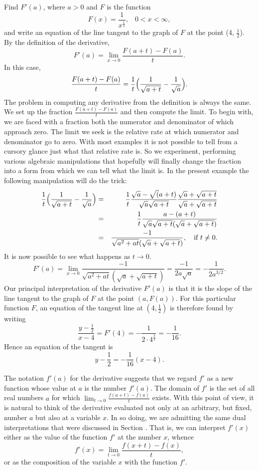 \begin{example}{\label{exam 1.6.3}}
Find $F'(a)$, where $a > 0$ and $F$ is the function
$$
F(x) = \frac{1}{x^{\frac{1}{2}}}, \;\;\;   0 < x < \infty ,
$$
and write an equation of the line
tangent to the graph of $F$ at the point (4, $\frac{1}{2}$).
By the definition of the derivative,
$$
F'(a) = \lim_{x \rightarrow 0} { \frac{F(a + t) - F(a)}{t} } .
$$
In this case,
$$
\frac{F(a + t) - F(a)}{t} = \frac{1}{t} \Bigl( \frac{1}{\sqrt{a + t}} -
\frac{1}{\sqrt a} \Bigr) .
$$
The problem in computing any derivative from the definition
is always the same.
We set up the fraction $\frac{F(a + t) - F(a)}{t}$
and then compute the limit.
To begin with,
we are faced with a fraction
both the numerator and denominator of which approach zero.
The limit we seek is
the relative rate at which numerator and denominator go to zero.
With most examples it is not possible to tell from a cursory glance
just what that relative rate is.
So we experiment, performing various algebraic manipulations
that hopefully will finally change the fraction into a form
from which we can tell what the limit is.
In the present example the following manipulation will do the trick:
\begin{eqnarray*}
\frac{1}{t} \Bigl( \frac{1}{\sqrt{a + t}} - \frac{1}{\sqrt a} \Bigr)
&=& 
{\frac{1}{t}}
{\frac{\sqrt{a} - \sqrt(a + t)}{\sqrt{a} \sqrt{a + t}} }
{\frac{\sqrt{a} + \sqrt{a + t}}{\sqrt{a} + \sqrt{a + t}} }  \\
&=& 
{\frac{1}{t}}
{\frac{a - (a + t)}{\sqrt{a} \sqrt{a + t}
(\sqrt{a} + \sqrt{a + t})}  }\\
&=& 
\frac {-1} {\sqrt{a^2 + at} (\sqrt{a} + \sqrt{a + t} ) },
\quad \mbox{if $t \neq 0$}.
\end{eqnarray*}
It is now possible to see what happens as $t \rightarrow 0$.
$$
F'(a)
=
\lim_{x \rightarrow 0}
{ \frac{-1}{ \sqrt{a^2 + at}
(\sqrt{a} + \sqrt{a + t}) }  }
=
\frac{-1}{2a \sqrt{a}} = - \frac{1}{2a^{3/2}} .
$$
Our principal interpretation of the derivative $F'(a)$
is that it is the slope of the line tangent to the graph of $F$
at the point $(a, F(a))$.
For this particular function $F$,
an equation of the tangent line at
$(4, \frac{1}{2})$
is therefore found by writing
$$
\frac{y - \frac{1}{2}}{x - 4} = F'(4) = -\frac{1}{2 \cdot 4^{\frac{3}{2}}} = -\frac{1}{16} .
$$
Hence an equation of the tangent is
$$
y - \frac{1}{2} = - {\frac{1}{16}} (x - 4).
$$
\end{example}

The notation $f'(a)$ for the derivative
suggests that we regard $f'$
as a new function whose value at $a$
is the number $f'(a)$.
The domain of $f'$ is the set of all real numbers $a$
for which
$\lim_{t \rightarrow 0} \frac{f(a + t) - f(a)}{t}$ exists.
With this point of view,
it is natural to think of the derivative evaluated
not only at an arbitrary, but fixed, number $a$
but also at a variable $x$.
In so doing, we are admitting the same dual interpretations
that were discussed in Section .
That is, we can interpret $f'(x)$
either as the value of the function $f'$ at the number $x$,
whence
$$
f'(x) = \lim_{t \rightarrow 0} \frac{f(x + t) - f(x)}{t},
$$
or as the composition of the variable $x$ with the function $f'$.

